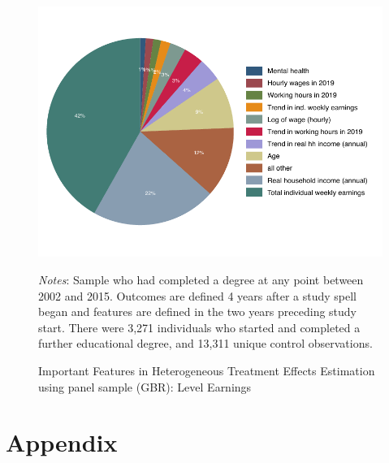 \documentclass[12pt, a4paper]{article}
\begin{document}
\begin{figure}[htbp]
\centering
\caption{Important Features in Heterogeneous Treatment Effects Estimation using panel sample (GBR): Level Earnings}
\vspace{0.5cm}
  \label{fig:featgbr_panel}
    \includegraphics{_figures/influenceP_GBR_csnopoly.pdf}
\parbox{1\textwidth}{\footnotesize{\textit{Notes}: Sample who had completed a degree at any point between 2002 and 2015. Outcomes are defined 4 years after a study spell began and features are defined in the two years preceding study start. There were 3,271 individuals who started and completed a further educational degree, and 13,311 unique control observations.}}
\end{figure}



\clearpage




\clearpage
\section{Appendix}
%
%
\end{document}

